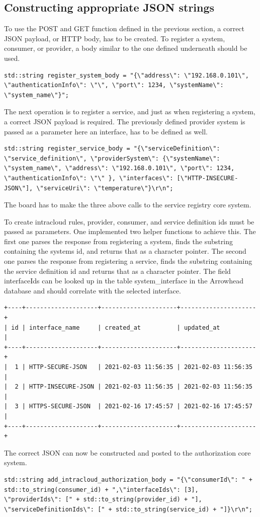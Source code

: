 \subsection{Constructing appropriate JSON strings}
To use the POST and GET function defined in the previous section, a correct JSON payload, or HTTP body, has to be created.
To register a system, consumer, or provider, a body similar to the one defined underneath should be used.
\begin{lstlisting}[style=CStyle]
    std::string register_system_body = "{\"address\": \"192.168.0.101\", \"authenticationInfo\": \"\", \"port\": 1234, \"systemName\": \"system_name\"}";
\end{lstlisting}

The next operation is to register a service, and just as when registering a system, a correct JSON payload is required.
The previously defined provider system is passed as a parameter here an interface, has to be defined as well.
\begin{lstlisting}[style=CStyle]
    std::string register_service_body = "{\"serviceDefinition\": \"service_definition\", \"providerSystem\": {\"systemName\": \"system_name\", \"address\": \"192.168.0.101\", \"port\": 1234, \"authenticationInfo\": \"\" }, \"interfaces\": [\"HTTP-INSECURE-JSON\"], \"serviceUri\": \"temperature\"}\r\n";
\end{lstlisting}
The board has to make the three above calls to the service registry core system.

To create intracloud rules, provider, consumer, and service definition ids must be passed as parameters.
One implemented two helper functions to achieve this.
The first one parses the response from registering a system, finds the substring containing the systems id, and returns that as a character pointer.
The second one parses the response from registering a service, finds the substring containing the service definition id and returns that as a character pointer.
The field interfaceIds can be looked up in the table system\_interface in the Arrowhead database and should correlate with the selected interface.
\begin{lstlisting}[style=SQLstyle]
+----+--------------------+---------------------+---------------------+
| id | interface_name     | created_at          | updated_at          |
+----+--------------------+---------------------+---------------------+
|  1 | HTTP-SECURE-JSON   | 2021-02-03 11:56:35 | 2021-02-03 11:56:35 |
|  2 | HTTP-INSECURE-JSON | 2021-02-03 11:56:35 | 2021-02-03 11:56:35 |
|  3 | HTTPS-SECURE-JSON  | 2021-02-16 17:45:57 | 2021-02-16 17:45:57 |
+----+--------------------+---------------------+---------------------+
\end{lstlisting}
The correct JSON can now be constructed and posted to the authorization core system.
\begin{lstlisting}[style=CStyle]
    std::string add_intracloud_authorization_body = "{\"consumerId\": " + std::to_string(consumer_id) + ",\"interfaceIds\": [3], \"providerIds\": [" + std::to_string(provider_id) + "], \"serviceDefinitionIds\": [" + std::to_string(service_id) + "]}\r\n";
\end{lstlisting}

